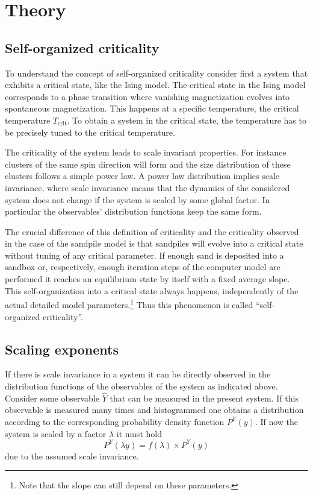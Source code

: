 \section{Theory}
\label{sec:theory}

\subsection{Self-organized criticality}
\label{sec:th:SOC}
To understand the concept of self-organized criticality consider first a system that exhibits a critical state,
like the Ising model. The critical state in the Ising model corresponds to a phase transition where vanishing
magnetization evolves into spontaneous magnetization. This happens at a specific temperature, the critical temperature
$T_{\mathrm{crit}}$. To obtain a system in the critical state, the temperature has to be precisely tuned to the critical
temperature.

The criticality of the system leads to scale invariant properties. For instance clusters of the same spin direction
will form and the size distribution of these clusters follows a simple power law. A power law distribution implies
scale invariance, where scale invariance means that the dynamics of the considered system does not change if the system
is scaled by some global factor. In particular the observables' distribution functions keep the same form.

The crucial difference of this definition of criticality and the criticality observed in the case of the sandpile model
is that sandpiles will evolve into a critical state without tuning of any critical parameter.
If enough sand is deposited into a sandbox or, respectively, enough iteration steps of the computer model are performed
it reaches an equilibrium state by itself with a fixed average slope. This self-organization into a critical state
always happens, independently of the actual detailed model parameters.\footnote{Note that the slope can still depend
on these parameters.} Thus this phenomenon is called \enquote{self-organized criticality}.

\subsection{Scaling exponents}
\label{sec:th:scaling}
If there is scale invariance in a system it can be directly observed in the distribution functions
of the observables of the system as indicated above. Consider some observable $\hat{Y}$ that can be measured in the
present system. If this observable is measured many times and histogrammed one obtains a distribution according to the
corresponding probability density function $P^{Y}(y)$.
If now the system is scaled by a factor $\lambda$ it must hold
\begin{equation}\label{eq:scalingCondition}
P^{Y}(\lambda y) = f(\lambda) \times P^{Y}(y)
\end{equation}
due to the assumed scale invariance.

